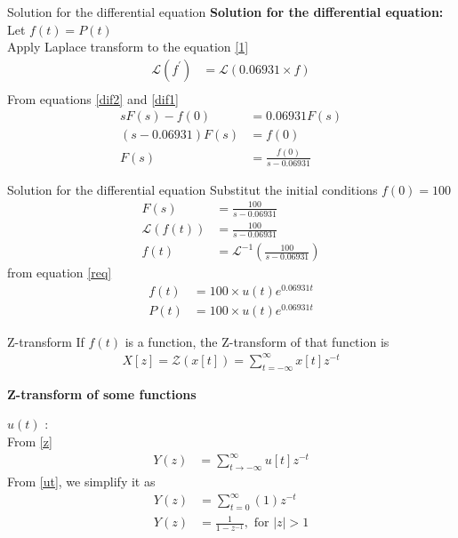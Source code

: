 \documentclass{beamer}
\providecommand{\sbrak}[1]{\ensuremath{{}\left[#1\right]}}
\providecommand{\brak}[1]{\ensuremath{\left(#1\right)}}
\theoremstyle{remark}
\providecommand{\abs}[1]{\left\vert#1\right\vert}
\numberwithin{equation}{section}
\begin{document}
\begin{frame}{Solution for the differential equation}
    \textbf{Solution for the differential equation:}\\
    Let $f\brak{t} = P\brak{t}$\\
    Apply Laplace transform to the equation \eqref{1}
    \begin{align}
        \mathcal{L}\brak{f^{\prime}} &= \mathcal{L}\brak{0.06931\times f}\\
    \end{align}
    From equations \eqref{dif2} and \eqref{dif1}
    \begin{align}
        sF\brak{s} - f\brak{0} &= 0.06931F\brak{s}\\
        \brak{s - 0.06931}F\brak{s} &= f\brak{0}\\
        F\brak{s} &= \frac{f\brak{0}}{s - 0.06931}
    \end{align}
    \end{frame}

\begin{frame}{Solution for the differential equation}
    Substitut the initial conditions $f\brak{0} = 100$
    \begin{align}
        F\brak{s} &= \frac{100}{s - 0.06931}\\
        \mathcal{L}\brak{f\brak{t}} &= \frac{100}{s - 0.06931}\\
        f\brak{t} &= \mathcal{L}^{-1}\brak{\frac{100}{s - 0.06931}}
    \end{align}
    from equation \eqref{req}
    \begin{align}
        f\brak{t} &= 100\times u\brak{t}e^{0.06931t}\\
        P\brak{t} &= 100\times u\brak{t}e^{0.06931t}
    \end{align}
\end{frame}

\begin{frame}{Z-transform}
  If $f\brak{t}$ is a function, the Z-transform of that function is
        \begin{align}
            X\sbrak{z} = \mathcal{Z}\brak{x\sbrak{t}} = \sum_{t = -\infty}^{\infty} {x\sbrak{t}}z^{-t} \label{z}
        \end{align}
    \end{frame}

\begin{frame}{ \textbf{Z-transform of some functions}}
       
       \textbf{$u(t)$} : \\
		From \eqref{z}
		\begin{align}
			Y(z) &= \sum_{t \to -\infty}^{\infty} u\sbrak{t} z^{-t} 
		\end{align}
		From \eqref{ut}, we simplify it as
		\begin{align}
		        Y(z) &= \sum_{t=0}^{\infty} (1)z^{-t} \\
			Y(z) &= \frac{1}{1 - z^{-1}}, \label{eq:zut} \text{ for } \abs{z} > 1 
		\end{align}
           \end{frame}
\end{document}
